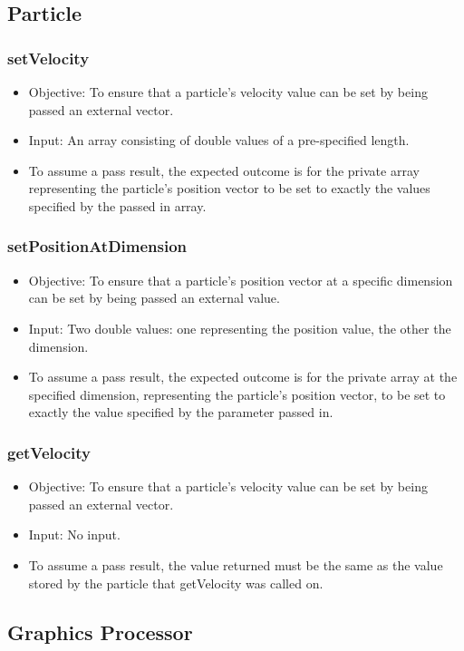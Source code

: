\documentclass[11pt]{article}
\begin{document}
\subsection{Particle}
\subsubsection{setVelocity}
\begin{itemize}
	\item Objective: To ensure that a particle's velocity value can be set by being passed an external vector.
	\item Input: An array consisting of double values of a pre-specified length.
	\item To assume a pass result, the expected outcome is for the private array representing the particle's position vector to be set to exactly the values specified by the passed in array.
\end{itemize}
\subsubsection{setPositionAtDimension}
\begin{itemize}
	\item Objective: To ensure that a particle's position vector at a specific dimension can be set by being passed an external value.
	\item Input: Two double values: one representing the position value, the other the dimension.
	\item To assume a pass result, the expected outcome is for the private array at the specified dimension, representing the particle's position vector,  to be set to exactly the value specified by the parameter passed in.
		\end{itemize}
\subsubsection{getVelocity}
\begin{itemize}
	\item Objective: To ensure that a particle's velocity value can be set by being passed an external vector.
	\item Input: No input.
	\item To assume a pass result, the value returned must be the same as the value stored by the particle that getVelocity was called on.
\end{itemize}
\subsection{Graphics Processor}
\end{document}
